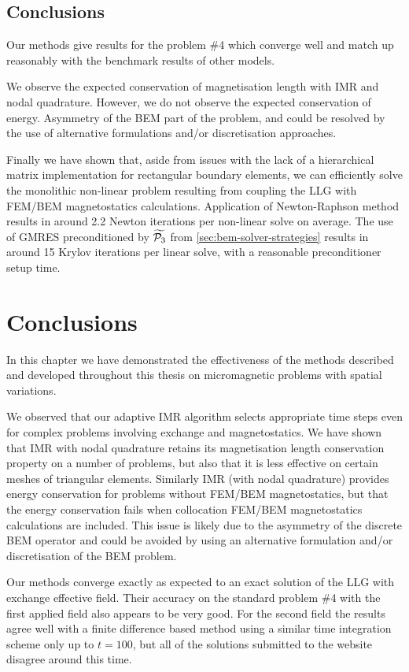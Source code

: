 \subsection{Conclusions}

Our methods give results for the \mumag problem \#4 which converge well and match up reasonably with the benchmark results of other models.

We observe the expected conservation of magnetisation length with IMR and nodal quadrature.
However, we do not observe the expected conservation of energy.
Asymmetry of the BEM part of the problem, and could be resolved by the use of alternative formulations and/or discretisation approaches.

Finally we have shown that, aside from issues with the lack of a hierarchical matrix implementation for rectangular boundary elements, we can efficiently solve the monolithic non-linear problem resulting from coupling the LLG with FEM/BEM magnetostatics calculations.
Application of Newton-Raphson method results in around 2.2 Newton iterations per non-linear solve on average.
The use of GMRES preconditioned by $\widetilde{\mathcal{P}_3}$ from \cref{sec:bem-solver-strategies} results in around 15 Krylov iterations per linear solve, with a reasonable preconditioner setup time.



\section{Conclusions}

In this chapter we have demonstrated the effectiveness of the methods described and developed throughout this thesis on micromagnetic problems with spatial variations.

We observed that our adaptive IMR algorithm selects appropriate time steps even for complex problems involving exchange and magnetostatics.
We have shown that IMR with nodal quadrature retains its magnetisation length conservation property on a number of problems, but also that it is less effective on certain meshes of triangular elements.
Similarly IMR (with nodal quadrature) provides energy conservation for problems without FEM/BEM magnetostatics, but that the energy conservation fails when collocation FEM/BEM magnetostatics calculations are included.
This issue is likely due to the asymmetry of the discrete BEM operator and could be avoided by using an alternative formulation and/or discretisation of the BEM problem.

Our methods converge exactly as expected to an exact solution of the LLG with exchange effective field.
Their accuracy on the \mumag standard problem \#4 with the first applied field also appears to be very good.
For the second field the results agree well with a finite difference based method using a similar time integration scheme only up to $t=100$, but all of the solutions submitted to the \mumag website disagree around this time.


